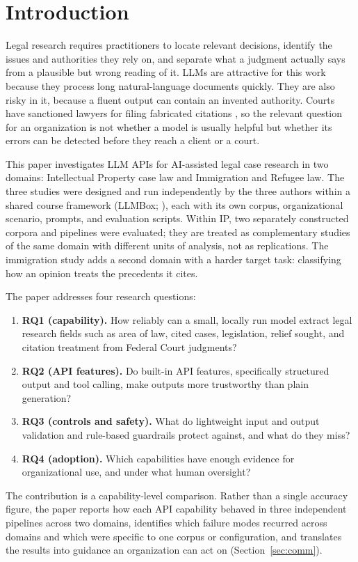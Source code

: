 \documentclass[10pt,letterpaper]{article}
\begin{document}
\section{Introduction}
Legal research requires practitioners to locate relevant decisions, identify the issues and authorities they rely on, and separate what a judgment actually says from a plausible but wrong reading of it. LLMs are attractive for this work because they process long natural-language documents quickly. They are also risky in it, because a fluent output can contain an invented authority. Courts have sanctioned lawyers for filing fabricated citations \cite{mata}, so the relevant question for an organization is not whether a model is usually helpful but whether its errors can be detected before they reach a client or a court.

This paper investigates LLM APIs for AI-assisted legal case research in two domains: Intellectual Property case law and Immigration and Refugee law. The three studies were designed and run independently by the three authors within a shared course framework (LLMBox; \cite{llmbox}), each with its own corpus, organizational scenario, prompts, and evaluation scripts. Within IP, two separately constructed corpora and pipelines were evaluated; they are treated as complementary studies of the same domain with different units of analysis, not as replications. The immigration study adds a second domain with a harder target task: classifying how an opinion treats the precedents it cites.

The paper addresses four research questions:
\begin{enumerate}
\item \textbf{RQ1 (capability).} How reliably can a small, locally run model extract legal research fields such as area of law, cited cases, legislation, relief sought, and citation treatment from Federal Court judgments?
\item \textbf{RQ2 (API features).} Do built-in API features, specifically structured output and tool calling, make outputs more trustworthy than plain generation?
\item \textbf{RQ3 (controls and safety).} What do lightweight input and output validation and rule-based guardrails protect against, and what do they miss?
\item \textbf{RQ4 (adoption).} Which capabilities have enough evidence for organizational use, and under what human oversight?
\end{enumerate}
The contribution is a capability-level comparison. Rather than a single accuracy figure, the paper reports how each API capability behaved in three independent pipelines across two domains, identifies which failure modes recurred across domains and which were specific to one corpus or configuration, and translates the results into guidance an organization can act on (Section~\ref{sec:comm}).
\end{document}
